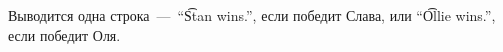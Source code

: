 Выводится одна строка~---~``\t{Stan wins.}'', если победит Слава, или ``\t{Ollie wins.}'', если победит Оля.
